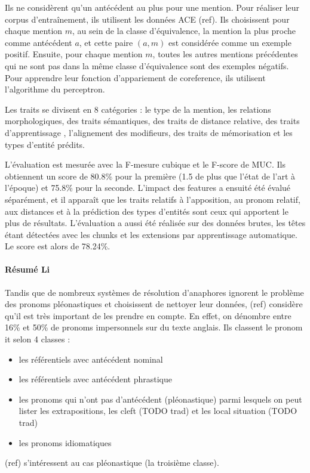 \documentclass[a4paper,12pt]{article}
\begin{document}
Ils ne considèrent qu'un antécédent au plus pour une mention. Pour réaliser leur corpus d'entraînement, ils utilisent les données ACE (ref). Ils choisissent pour chaque mention $m$, au sein de la classe d'équivalence, la mention la plus proche comme antécédent $a$, et cette paire $(a,m)$ est considérée comme un exemple positif. Ensuite, pour chaque mention $m$, toutes les autres mentions précédentes qui ne sont pas dans la même classe d'équivalence sont des exemples négatifs. Pour apprendre leur fonction d'appariement de coreference, ils utilisent l'algorithme du perceptron.

Les traits se divisent en 8 catégories : le type de la mention, les relations morphologiques, des traits sémantiques, des traits de distance relative, des traits d'apprentissage , l'alignement des modifieurs, des traits de mémorisation et les types d'entité prédits.

L'évaluation est mesurée avec la F-mesure cubique et le F-score de MUC. Ils obtiennent un score de 80.8\% pour la première (1.5 de plus que l'état de l'art à l'époque) et 75.8\% pour la seconde.
L'impact des features a ensuité été évalué séparément, et il apparaît que les traits relatifs à l'apposition, au pronom relatif, aux distances et à la prédiction des types d'entités sont ceux qui apportent le plus de résultats.
L'évaluation a aussi été réalisée sur des données brutes, les têtes étant détectées avec les chunks et les extensions par apprentissage automatique. Le score est alors de 78.24\%.

\paragraph{Résumé Li}
Tandis que de nombreux systèmes de résolution d'anaphores ignorent le problème des pronoms pléonastiques et choisissent de nettoyer leur données, (ref) considère qu'il est très important de les prendre en compte.
En effet, on dénombre entre 16\% et 50\% de pronoms impersonnels sur du texte anglais.
Ils classent le pronom \og it \fg{} selon 4 classes :
\begin{itemize}
\item les référentiels avec antécédent nominal
\item les référentiels avec antécédent phrastique
\item les pronoms qui n'ont pas d'antécédent (pléonastique) parmi lesquels on peut lister les extrapositions, les cleft (TODO trad) et les local situation (TODO trad)
\item les pronoms idiomatiques
\end{itemize}
(ref) s'intéressent au cas pléonastique (la troisième classe).
\end{document}
